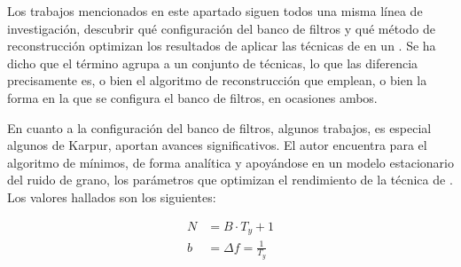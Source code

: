 Los trabajos mencionados en este apartado siguen todos una misma línea de investigación, descubrir qué configuración del banco de filtros y qué método de reconstrucción optimizan los resultados de aplicar las técnicas de  en un . Se ha dicho que el término  agrupa a un conjunto de técnicas, lo que las diferencia precisamente es, o bien el algoritmo de reconstrucción que emplean, o bien la forma en la que se configura el banco de filtros, en ocasiones ambos.\par
En cuanto a la configuración del banco de filtros, algunos trabajos, es especial algunos de Karpur, aportan avances significativos. El autor encuentra para el algoritmo de mínimos, de forma analítica y apoyándose en un modelo estacionario del ruido de grano, los parámetros que optimizan el rendimiento de la técnica de . Los valores hallados son los siguientes:

\begin{equation}
	\begin{split}
		N & = B\cdot T_y + 1 \\	
		b & = \Delta f = \frac{1}{T_y}
	\end{split}
\end{equation}

